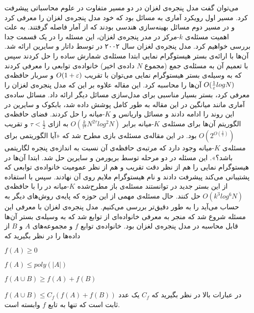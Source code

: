 می‌توان گفت مدل پنجره‌ی لغزان در دو مسیر متفاوت در علوم محاسباتی پیشرفت کرد. مسیر اول رویکرد آماری به مسائل بود که خود مدل پنجره‌ی لغزان را معرفی کرد و در مسیر دوم مسائل بهینه‌سازی هندسی بودند که از آمار فاصله گرفتند. به علت اهمیت مسئله‌ی $k$-مرکز در مدر پنجره‌ی لغزان، این مسئله را در یک قسمت جدا بررسی خواهیم کرد.
مدل پنجره‌ی لغزان سال ۲۰۰۲ در 
توسط داتار و سایرین ارائه شد. آن‌ها با ارائه‌ی بستر هیستوگرام نمایی  ابتدا مسئله‌ی شمارش ساده را حل کردند سپس با تعمیم آن به مسئله‌ی جمع (مجموع $N$ داده‌ی اخیر) خانواده‌ی توابعی را معرفی کردند که به وسیله‌ی بستر هیستوگرام نمایی می‌توان با تقریب $O(1+\varepsilon)$ و سربار حافظه‌ی $O(\frac{1}{\varepsilon} log N)$ آن‌‌ها را محاسبه کرد. این مقاله علاوه بر این که مدل پنجره‌ی لغزان را معرفی کرد، بستر بسیار مناسبی برای مدل‌سازی مسائل دیگر ارائه داد. مسائل ساده‌ی آماری مانند میانگین در این مقاله به طور کامل پوشش داده شد، بابکوک و سایرین در  این روند را ادامه دادند و مسائل واریانس و $K$-میانه  را حل کردند. فضای حافظه‌ی الگوریتم آن‌ها برای مسئله‌ی $K$-میانه برابر
$O(\frac{k}{\tau^4}N^{2\tau} log^2 N)$
به ازای $ \tau < \frac{1}{2}$  و تقریب
$O(2^{O(\frac{1}{\tau})})$
بود. در این مقاله‌ی مسئله‌ی بازی مطرح شد که «آیا الگوریتمی برای مسئله‌ی $K$-میانه وجود دارد که مرتبه‌ی حافظه‌ی آن نسبت به اندازه‌ی پنجره لگاریتمی باشد؟». این مسئله در دو مرحله توسط بریورمن و سایرین حل شد. ابتدا آن‌ها در 
  هیستوگرام نمایی را هم از نظر دقت تقریب و هم از نظر عمومیت خانواده‌ی توابعی که پشتیبانی می‌کند پیشرفت دادند و نام هیستوگرام ملایم  روی آن نهادند. سپس با استفاده از این بستر جدید در  
توانستند مسئله‌ی باز مطرح‌شده $K$-میانه در 
را با حافظه‌ی $ O(k^3 log^6 N)$ حل کنند.
حال مسئله‌ی مهمی از این حوزه که پایه‌ی روش‌های دیگر به حساب می‌آید را به طور دقیق‌تر بررسی می‌کنیم.
مدل پنجره‌ی لغزان با معرفی این مسئله شروع شد که منجر به معرفی خانواده‌ای از توابع شد که به وسیله‌ی بستر‌ آن‌ها قابل محاسبه در مدل پنجره‌ی لغزان بود. خانواده‌ی توابع $f$ و مجموعه‌های $A$ و $B$ از داده‌ها را در نظر بگیرید که

\item $f(A) \ge 0$
\item $f(A) \le poly(|A|)$
\item $f(A \cup B) \ge f(A) + f(B)$
\item $f(A \cup B) \le C_f (f(A) + f(B))$
در عبارات بالا در نظر بگیرید که $C_f$ یک عدد ثابت است که تنها به تابع $f$ وابسته است.

